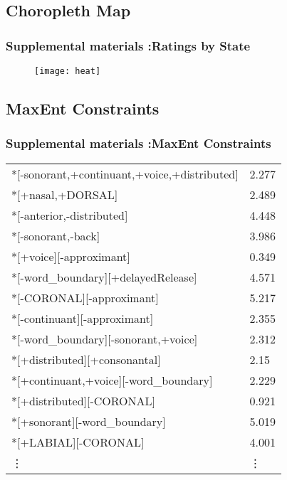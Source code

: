 \documentclass{beamer}
\begin{document}
\subsection{Choropleth Map}
\begin{frame}
\frametitle{Supplemental materials :Ratings by State }
\begin{figure}
\texttt{[image: heat]}
\end{figure}
\end{frame}
\subsection{MaxEnt Constraints}
\begin{frame}
\frametitle{Supplemental materials :MaxEnt Constraints}
\begin{table}[]
\begin{tabular}{ll}
*{[}-sonorant,+continuant,+voice,+distributed{]}                  & 2.277 \\
*{[}+nasal,+DORSAL{]}                                             & 2.489 \\
*{[}-anterior,-distributed{]}                                     & 4.448 \\
*{[}-sonorant,-back{]}                                            & 3.986 \\
*{[}+voice{]}{[}-approximant{]}                                   & 0.349 \\
*{[}-word\_boundary{]}{[}+delayedRelease{]}                       & 4.571 \\
*{[}-CORONAL{]}{[}-approximant{]}                                 & 5.217 \\
*{[}-continuant{]}{[}-approximant{]}                              & 2.355 \\
*{[}-word\_boundary{]}{[}-sonorant,+voice{]}                      & 2.312 \\
*{[}+distributed{]}{[}+consonantal{]}                             & 2.15  \\
*{[}+continuant,+voice{]}{[}-word\_boundary{]}                    & 2.229 \\
*{[}+distributed{]}{[}-CORONAL{]}                                 & 0.921 \\
*{[}+sonorant{]}{[}-word\_boundary{]}                             & 5.019 \\
*{[}+LABIAL{]}{[}-CORONAL{]}                                      & 4.001 \\
\vdots & \vdots \\
\end{tabular}
\end{table}
\end{frame}
\end{document}
